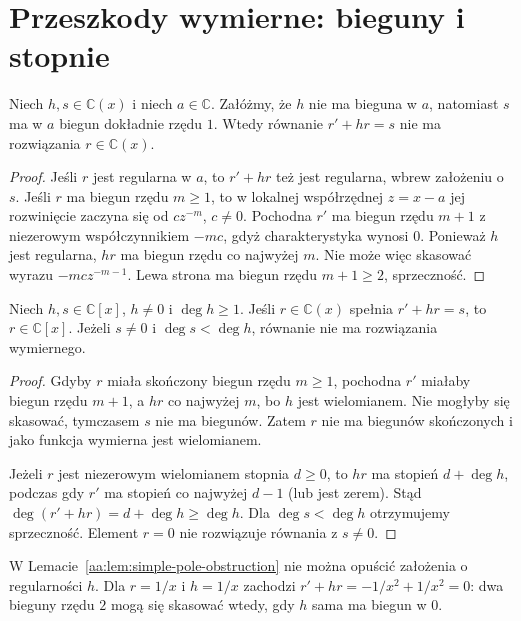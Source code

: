 \section{Przeszkody wymierne: bieguny i stopnie}

\begin{lemat}
\label{aa:lem:simple-pole-obstruction}
Niech $h,s\in\mathbb C(x)$ i niech
$a\in\mathbb C$. Załóżmy, że $h$
nie ma bieguna w $a$, natomiast $s$
ma w $a$ biegun dokładnie rzędu $1$.
Wtedy równanie $r'+hr=s$
nie ma rozwiązania $r\in\mathbb C(x)$.
\end{lemat}
\begin{proof}
Jeśli $r$ jest regularna w $a$,
to $r'+hr$ też jest regularna,
wbrew założeniu o $s$.
Jeśli $r$ ma biegun rzędu $m\ge1$,
to w lokalnej współrzędnej $z=x-a$
jej rozwinięcie zaczyna się od
$c z^{-m}$, $c\ne0$. Pochodna
$r'$ ma biegun rzędu $m+1$ z niezerowym
współczynnikiem $-mc$, gdyż
charakterystyka wynosi $0$.
Ponieważ $h$ jest regularna, $hr$
ma biegun rzędu co najwyżej $m$.
Nie może więc skasować wyrazu
$-mc z^{-m-1}$. Lewa strona ma
biegun rzędu $m+1\ge2$, sprzeczność.
\end{proof}

\begin{lemat}
\label{aa:lem:polynomial-degree-obstruction}
Niech $h,s\in\mathbb C[x]$,
$h\ne0$ i $\deg h\ge1$. Jeśli
$r\in\mathbb C(x)$ spełnia
$r'+hr=s$, to $r\in\mathbb C[x]$.
Jeżeli $s\ne0$ i $\deg s<\deg h$,
równanie nie ma rozwiązania wymiernego.
\end{lemat}
\begin{proof}
Gdyby $r$ miała skończony biegun
rzędu $m\ge1$, pochodna $r'$
miałaby biegun rzędu $m+1$,
a $hr$ co najwyżej $m$,
bo $h$ jest wielomianem.
Nie mogłyby się skasować,
tymczasem $s$ nie ma biegunów.
Zatem $r$ nie ma biegunów skończonych
i jako funkcja wymierna jest wielomianem.

Jeżeli $r$ jest niezerowym wielomianem
stopnia $d\ge0$, to $hr$ ma stopień
$d+\deg h$, podczas gdy $r'$
ma stopień co najwyżej $d-1$
(lub jest zerem). Stąd
$\deg(r'+hr)=d+\deg h\ge\deg h$.
Dla $\deg s<\deg h$ otrzymujemy
sprzeczność. Element $r=0$ nie
rozwiązuje równania z $s\ne0$.
\end{proof}

\begin{uwaga}
\label{aa:uw:pole-obstruction-edge}
W Lemacie~\ref{aa:lem:simple-pole-obstruction}
nie można opuścić założenia o regularności $h$.
Dla $r=1/x$ i $h=1/x$ zachodzi
$r'+hr=-1/x^2+1/x^2=0$:
dwa bieguny rzędu $2$ mogą się skasować
wtedy, gdy $h$ sama ma biegun w $0$.
\end{uwaga}

